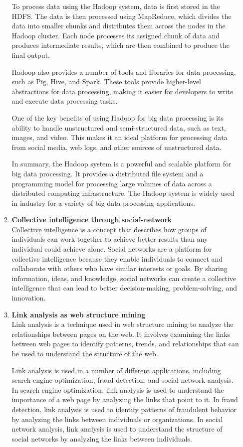 \documentclass[12pt]{article}
\begin{document}
\begin{enumerate}
\begin{enumerate}
    To process data using the Hadoop system, data is first stored in the HDFS. The data is then processed using MapReduce, which divides the data into smaller chunks and distributes them across the nodes in the Hadoop cluster. Each node processes its assigned chunk of data and produces intermediate results, which are then combined to produce the final output.
    
    Hadoop also provides a number of tools and libraries for data processing, such as Pig, Hive, and Spark. These tools provide higher-level abstractions for data processing, making it easier for developers to write and execute data processing tasks.
    
    One of the key benefits of using Hadoop for big data processing is its ability to handle unstructured and semi-structured data, such as text, images, and video. This makes it an ideal platform for processing data from social media, web logs, and other sources of unstructured data.
    
    In summary, the Hadoop system is a powerful and scalable platform for big data processing. It provides a distributed file system and a programming model for processing large volumes of data across a distributed computing infrastructure. The Hadoop system is widely used in industry for a variety of big data processing applications.
    \item {\bfseries Collective intelligence through social-network\\}
    Collective intelligence is a concept that describes how groups of individuals can work together to achieve better results than any individual could achieve alone. Social networks are a platform for collective intelligence because they enable individuals to connect and collaborate with others who have similar interests or goals. By sharing information, ideas, and knowledge, social networks can create a collective intelligence that can lead to better decision-making, problem-solving, and innovation.
    \item {\bfseries Link analysis as web structure mining\\}
    Link analysis is a technique used in web structure mining to analyze the relationships between pages on the web. It involves examining the links between web pages to identify patterns, trends, and relationships that can be used to understand the structure of the web.

Link analysis is used in a number of different applications, including search engine optimization, fraud detection, and social network analysis. In search engine optimization, link analysis is used to understand the importance of a web page by analyzing the links that point to it. In fraud detection, link analysis is used to identify patterns of fraudulent behavior by analyzing the links between individuals or organizations. In social network analysis, link analysis is used to understand the structure of social networks by analyzing the links between individuals.


\end{enumerate}
\end{enumerate}
\end{document}
